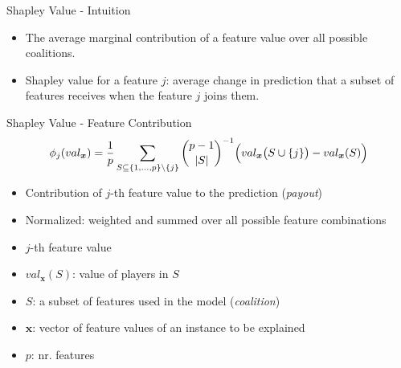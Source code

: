 \begin{frame}{Shapley Value - Intuition}
	\begin{itemize}
		\item The average marginal contribution of a feature value over all possible coalitions.
		\item Shapley value for a feature $j$: average change in prediction that a subset of features receives when the feature $j$ joins them.
	\end{itemize}
\end{frame}
\begin{frame}{Shapley Value - Feature Contribution}
\begin{equation}
	\phi_j(val_{\bm{x}})=\frac{1}{p}\sum_{S\subseteq\{1,\ldots,p\} \backslash \{j\}}\binom{p-1}{|S|}^{-1}\Bigl(val_{\bm{x}}\bigl(S\cup\{j\}\bigr)-val_{\bm{x}}(S)\Bigr)
\end{equation}
\begin{itemize}
	\item Contribution of $j$-th feature value to the prediction (\emph{payout})
	\item Normalized: weighted and summed over all possible feature combinations
	\item $j$-th feature value
	\item $val_{\bm{x}}(S)$: value of players in $S$ %
	\item $S$: a subset of features used in the model (\emph{coalition})
	\item $\bm{x}$: vector of feature values of an instance to be explained
	\item $p$: nr. features
\end{itemize}
\end{frame}





